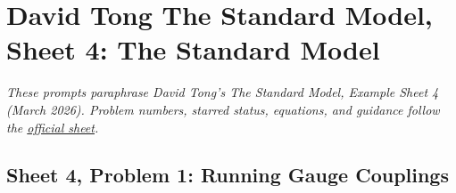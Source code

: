 \section{David Tong The Standard Model, Sheet 4: The Standard Model}

\noindent\textit{These prompts paraphrase David Tong's \emph{The Standard Model},
Example Sheet 4 (March 2026). Problem numbers, starred status, equations,
and guidance follow the
\href{https://davidtong.org/pdfs/teaching/standard-model/rw4.pdf}{official sheet}.}

\subsection{Sheet 4, Problem 1: Running Gauge Couplings}

